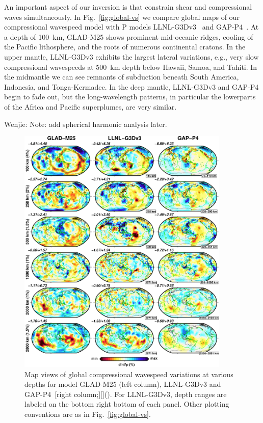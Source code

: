 \documentclass[extra,mreferee]{gji}
\begin{document}
An important aspect of our inversion is that constrain shear and compressional waves simultaneously.
In Fig.~\ref{fig:global-vs} we compare global maps of our compressional wavespeed model with P models LLNL-G3Dv3~\citep{simmons2012llnl} and GAP-P4~\citep{fukao2013subducted}.
At a depth of 100~km,
GLAD-M25 shows prominent mid-oceanic ridges, cooling of the Pacific lithosphere, and the roots of numerous continental cratons.
In the upper mantle, LLNL-G3Dv3 exhibits the largest lateral variations,
e.g., very slow compressional wavespeeds at 500~km depth below Hawaii, Samoa, and Tahiti.
In the midmantle we can see remnants of subduction beneath South America, Indonesia,
and Tonga-Kermadec.
In the deep mantle, LLNL-G3Dv3 and GAP-P4 begin to fade out, but the long-wavelength patterns,
in particular the lowerparts of the Africa and Pacific superplumes, are very similar.

{\color{red} Wenjie: Note: add spherical harmonic analysis later.}

\begin{figure}
\includegraphics[width=0.9\textwidth]{figures/depth_slice/globe_vp_LLNL-GAP.pdf}
  \caption{Map views of global compressional wavespeed variations at various depths for model
  GLAD-M25 (left column), LLNL-G3Dv3 \citep[middle column;][]{simmons2012llnl} and
  GAP-P4~[right column;][](\citep{fukao2013subducted}).
  For LLNL-G3Dv3, depth ranges are labeled on the bottom right
  bottom of each panel. Other plotting conventions are as in Fig.~\ref{fig:global-vs}.}
\label{fig:global-vp}
\centering
\end{figure}
\end{document}
